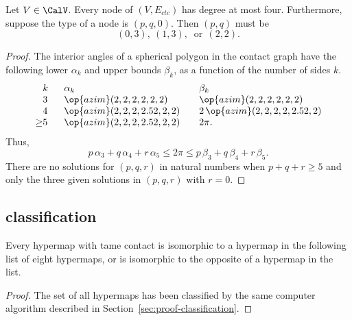 \begin{lemma}[]\label{lemma:no-5} 
  Let $V\in \CalV$.  Every node of $(V,E_{ctc})$ has degree at most
  four.  Furthermore, suppose the type of a node is $(p,q,0)$.  Then
  $(p,q)$ must be
\[
(0,3),~(1,3),~\text{ or}~~(2,2).
\]
\end{lemma}

\begin{proof} The interior angles of a spherical polygon in the
  contact graph have the following lower $\alpha_k$ and upper bounds
  $\beta_k$, as a function of the number of sides $k$.
\begin{equation}
\begin{array}{lllll}
  \phantom{\ge}k~~&\alpha_k & \beta_k\\
  \phantom{\ge}3~~&\op{azim}(2,2,2,2,2,2)  &\op{azim}(2,2,2,2,2,2)\\
  \phantom{\ge}4~~&\op{azim}(2,2,2,2.52,2,2) &2\,\op{azim}(2,2,2,2,2.52,2)\\
  {\ge}5~~& \op{azim}(2,2,2,2.52,2,2) ~~~& 2\pi.
\end{array}
\end{equation}
Thus,
\[
  p\,\alpha_3 + q\,\alpha_4 +r\, \alpha_5 
\le 2\pi \le p\,\beta_3 + q\,\beta_4 + r \,\beta_5.
\]
There are no solutions for
$(p,q,r)$ in natural numbers when $p+q+r\ge 5$ and
 only the three given solutions in $(p,q,r)$ with $r=0$.
\end{proof}



\subsection{classification}


\begin{lemma}\cutrate{}
  \label{lemma:contact-classification} Every hypermap with tame
  contact is isomorphic to a hypermap in the following list of eight
  hypermaps, or is isomorphic to the opposite of a hypermap in the
  list.  %
\end{lemma}

\begin{proof}
  The set of all hypermaps has been classified by the same computer
  algorithm described in Section~\ref{sec:proof-classification}.
\end{proof}



